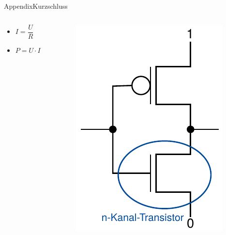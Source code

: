 \begin{frame}[allowframebreaks]{Appendix}{Kurzschluss}
  \begin{columns}
    \begin{column}{0.5\textwidth}
      \begin{itemize}
        \item $I=\dfrac{U}{R}$
        \item $P = U\cdot I$
      \end{itemize}
    \end{column}
    \begin{column}{0.5\textwidth}
      \includegraphics[height=0.6\textheight]{./figures/inverter.png}
    \end{column}
  \end{columns}
\end{frame}

\begin{frame}[allowframebreaks]
  
\end{frame}



